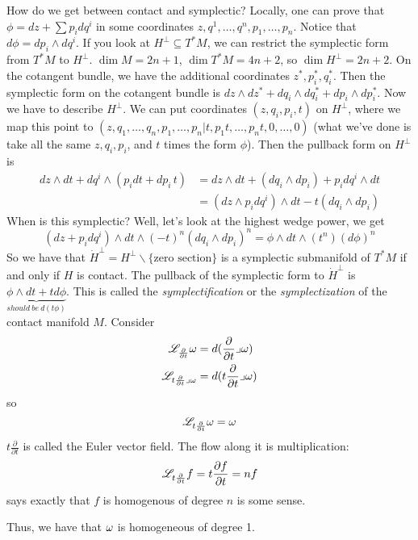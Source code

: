  How do we get between contact and symplectic?  Locally, one can
 prove that $\phi = dz + \sum p_idq^i$ in some coordinates
 $z,q^1,\dots, q^n,p_1,\dots, p_n$.  Notice that $d\phi =
 dp_i\wedge dq^i$.  If you look at $H^\perp\subseteq T^*M$, we can
 restrict the symplectic form from $T^*M$ to $H^\perp$.  $\dim
 M=2n+1$, $\dim T^*M=4n+2$, so $\dim H^\perp = 2n+2$.  On the
 cotangent bundle, we have the additional coordinates
 $z^*,p_i^*,q_i^*$.  Then the symplectic form on the cotangent
 bundle is $dz\wedge dz^* + dq_i\wedge dq_i^* + dp_i\wedge
 dp_i^*$.  Now we have to describe $H^\perp$.  We can put
 coordinates $(z,q_i,p_i, t)$ on $H^\perp$, where we map this
 point to $(z,q_1,\dots, q_n,p_1,\dots, p_n|t, p_1 t,\dots,
 p_nt,0,\dots, 0)$ (what we've done is take all the same
 $z,q_i,p_i$, and $t$ times the form $\phi$).  Then the pullback
 form on $H^\perp$ is
 \begin{align*}
  dz\wedge dt + dq^i\wedge(p_idt+dp_i\, t) &= dz\wedge dt +
  (dq_i\wedge dp_i) + p_i dq^i\wedge dt \\
  &= (dz\wedge p_idq^i)\wedge dt - t(dq_i\wedge dp_i)
 \end{align*}
 When is this symplectic?  Well, let's look at the highest wedge
 power, we get
 \[
    (dz+p_idq^i)\wedge dt \wedge (-t)^n (dq_i \wedge dp_i)^n =
    \phi\wedge dt\wedge (t^n) (d\phi)^n
 \]
 So we have that $\dot{H}^\perp = H^\perp \smallsetminus
 \{\text{zero section}\}$ is a symplectic submanifold of $T^*M$ if
 and only if $H$ is contact.  The pullback of the symplectic form
 to $\dot{H}^\perp$ is $\underbrace{\phi\wedge dt + t
 d\phi}_{should\ be\ d(t\phi)}$.  This is called the
 \emph{symplectification} or the \emph{symplectization} of the
 contact manifold $M$.  Consider
 \begin{align*}
   \mathscr{L}_{\frac{\partial}{\partial t}} \omega &=
   d(\frac{\partial}{\partial t} \lrcorner \omega)\\
   \mathscr{L}_{t \frac{\partial}{\partial t}\lrcorner \omega} &=
   d(t\frac{\partial}{\partial t}\lrcorner \omega)\\
 \end{align*}
 so
 \[
    \mathscr{L}_{t \frac{\partial}{\partial t}} \omega = \omega
 \]
 $t\frac{\partial}{\partial t}$ is called the Euler vector field.
 The flow along it is multiplication:
 \[
    \mathscr{L}_{t\frac{\partial}{\partial t}} f = t\frac{\partial f}{\partial
    t} = nf
 \]
 says exactly that $f$ is homogenous of degree $n$ is some sense.

 Thus, we have that $\omega$ is homogeneous of degree 1.

